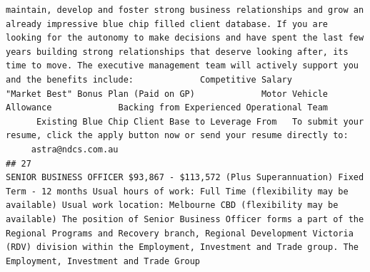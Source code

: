 \documentclass[11pt,a4paper,]{article}
\begin{document}
\begin{verbatim}
maintain, develop and foster strong business relationships and grow an already impressive blue chip filled client database. If you are looking for the autonomy to make decisions and have spent the last few years building strong relationships that deserve looking after, its time to move. The executive management team will actively support you and the benefits include:             Competitive Salary             "Market Best" Bonus Plan (Paid on GP)             Motor Vehicle Allowance             Backing from Experienced Operational Team             Existing Blue Chip Client Base to Leverage From   To submit your resume, click the apply button now or send your resume directly to:        astra@ndcs.com.au
## 27                                                                                                                                                                                                                                                                                                                                                                                                                                                                                                                                                                                                                                                                                                                                                                                                                                                                                                                                                                                                                                                                                                                                                                                                                                                                                                                                                                                                                                                                                                                                                                                                                                                                                                                                                                                                                                                                                                                                                                                                                                                                                                                                                                                                                              SENIOR BUSINESS OFFICER $93,867 - $113,572 (Plus Superannuation) Fixed Term - 12 months Usual hours of work: Full Time (flexibility may be available) Usual work location: Melbourne CBD (flexibility may be available) The position of Senior Business Officer forms a part of the Regional Programs and Recovery branch, Regional Development Victoria (RDV) division within the Employment, Investment and Trade group. The Employment, Investment and Trade Group 
\end{verbatim}
\end{document}
